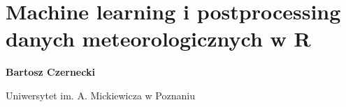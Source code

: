 \documentclass[\main/boa.tex]{subfiles}
\begin{document}
\section{Machine learning i postprocessing danych meteorologicznych w R}

\begin{minipage}{0.915\textwidth}
	\centering
  {\bf {} Bartosz Czernecki}
\end{minipage}

\vskip 0.3cm

\begin{affiliations}
\begin{minipage}{0.915\textwidth}
\centering
Uniwersytet im. A. Mickiewicza w Poznaniu  \\[-2pt]
\end{minipage}
\end{affiliations}

\vskip 0.8cm
\end{document}
